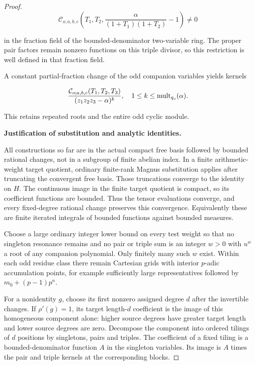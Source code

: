 \documentclass[11pt,a4paper]{article}
\theoremstyle{definition}
\begin{document}
\begin{proof}
\[
\mathcal C_{o;a,b,c}
 \left(T_1,T_2,\frac{\alpha}{(1+T_1)(1+T_2)}-1\right)\ne0
\tag{CU.1}
\]

in the fraction field of the bounded-denominator two-variable ring. The proper pair factors remain nonzero functions on this triple divisor, so this restriction is well defined in that fraction field.

A constant partial-fraction change of the odd companion variables yields kernels

\[
\frac{\mathcal C_{o;a,b,c}(T_1,T_2,T_3)}
 {(z_1z_2z_3-\alpha)^k},
\quad 1\le k\le {\rm mult}_{q_o}(\alpha).
\]

This retains repeated roots and the entire odd cyclic module.

\par\medskip\noindent\textbf{Justification of substitution and analytic identities.}

All constructions so far are in the actual compact free basis followed by bounded rational changes, not in a subgroup of finite abelian index. In a finite arithmetic-weight target quotient, ordinary finite-rank Magnus substitution applies after truncating the convergent free basis. Those truncations converge to the identity on \(H\). The continuous image in the finite target quotient is compact, so its coefficient functions are bounded. Thus the tensor evaluations converge, and every fixed-degree rational change preserves this convergence. Equivalently these are finite iterated integrals of bounded functions against bounded measures.

Choose a large ordinary integer lower bound on every test weight so that no singleton resonance remains and no pair or triple sum is an integer \(w>0\) with \(u^w\) a root of any companion polynomial. Only finitely many such \(w\) exist. Within each odd residue class there remain Cartesian grids with interior \(p\)-adic accumulation points, for example sufficiently large representatives followed by \(m_0+(p-1)p^n\).

For a nonidentity \(g\), choose its first nonzero assigned degree \(d\) after the invertible changes. If \(\rho'(g)=1\), its target length-\(d\) coefficient is the image of this homogeneous component alone: higher source degrees have greater target length and lower source degrees are zero. Decompose the component into ordered tilings of \(d\) positions by singletons, pairs and triples. The coefficient of a fixed tiling is a bounded-denominator function \(A\) in the singleton variables. Its image is \(A\) times the pair and triple kernels at the corresponding blocks.


\end{proof}
\end{document}
